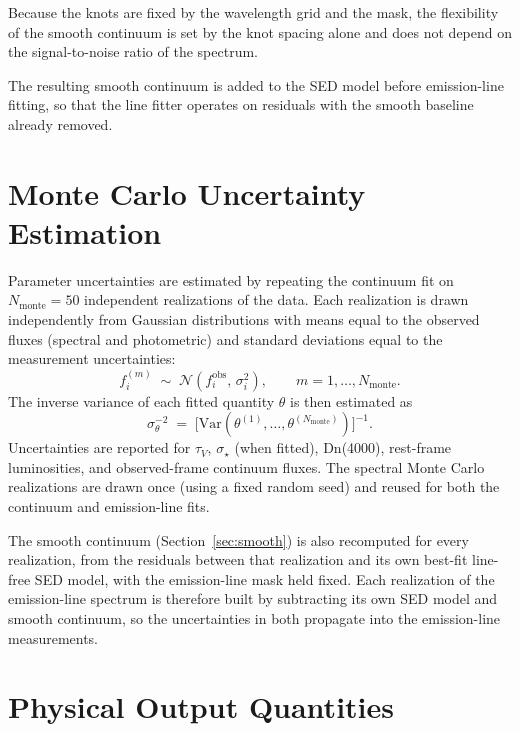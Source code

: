 \documentclass[12pt]{article}
\newcommand{\tauv}{\tau_{V}}
\newcommand{\vdisp}{\sigma_{\star}}
\begin{document}
Because the knots are fixed by the wavelength grid and the mask, the
flexibility of the smooth continuum is set by the knot spacing alone and
does not depend on the signal-to-noise ratio of the spectrum.

The resulting smooth continuum is added to the SED model before emission-line
fitting, so that the line fitter operates on residuals with the smooth
baseline already removed.


\section{Monte Carlo Uncertainty Estimation}
\label{sec:monte}

Parameter uncertainties are estimated by repeating the continuum fit on
$N_{\mathrm{monte}} = 50$ independent realizations of the data.  Each
realization is drawn independently from Gaussian distributions with means
equal to the observed fluxes (spectral and photometric) and standard
deviations equal to the measurement uncertainties:
\begin{equation}
  f_i^{(m)} \;\sim\; \mathcal{N}(f_i^{\mathrm{obs}},\,\sigma_i^2),
  \qquad m = 1,\ldots,N_{\mathrm{monte}}.
\end{equation}
The inverse variance of each fitted quantity $\theta$ is then estimated as
\begin{equation}
  \sigma_\theta^{-2} \;=\; \bigl[\mathrm{Var}(\theta^{(1)},\ldots,\theta^{(N_{\mathrm{monte}})})\bigr]^{-1}.
\end{equation}
Uncertainties are reported for $\tauv$, $\vdisp$ (when fitted), Dn(4000),
rest-frame luminosities, and observed-frame continuum fluxes.  The spectral
Monte Carlo realizations are drawn once (using a fixed random seed) and
reused for both the continuum and emission-line fits.

The smooth continuum (Section~\ref{sec:smooth}) is also recomputed for every
realization, from the residuals between that realization and its own
best-fit line-free SED model, with the emission-line mask held fixed.  Each
realization of the emission-line spectrum is therefore built by subtracting
its own SED model and smooth continuum, so the uncertainties in both
propagate into the emission-line measurements.


\section{Physical Output Quantities}
\label{sec:outputs}
\end{document}
